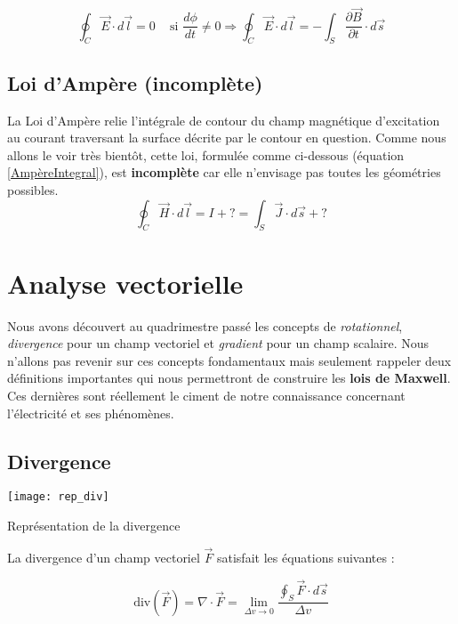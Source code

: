 \begin{equation}
 \oint_{C} \vec{E} \cdot d\vec{l} = 0 \hspace{10pt} \mbox{ si } \frac{d\phi}{dt} \not = 0 \Rightarrow  \oint_{C} \vec{E} \cdot d\vec{l} = -\int_{S} \frac{\partial \vec{B}}{\partial t} \cdot d\vec{s}
 \label{PotentielIntegral}
\end{equation}

\subsection{Loi d'Ampère (incomplète)}

La Loi d'Ampère relie l'intégrale de contour du champ magnétique d'excitation au courant traversant la surface décrite par le contour en question. 
Comme nous allons le voir très bientôt, cette loi, formulée comme ci-dessous (équation \ref{AmpèreIntegral}), est \textbf{incomplète} car elle n'envisage pas toutes les géométries possibles.
\begin{equation}
 \oint_{C} \vec{H} \cdot d\vec{l} = I + ? = \int_{S} \vec{J} \cdot d\vec{s} + ? 
 \label{AmpèreIntegral}
\end{equation}

\section{Analyse vectorielle}

Nous avons découvert au quadrimestre passé les concepts de \textit{rotationnel}, \textit{divergence} pour un champ vectoriel et \textit{gradient} pour un champ scalaire.
Nous n'allons pas revenir sur ces concepts fondamentaux mais seulement rappeler deux définitions importantes qui nous permettront de construire les \textbf{lois de Maxwell}. 
Ces dernières sont réellement le ciment de notre connaissance concernant l'électricité et ses phénomènes.

\subsection{Divergence} 
\begin{marginfigure}[0cm]
	\texttt{[image: rep\_div]}
	\caption{Représentation de la divergence}
\end{marginfigure}

La divergence d'un champ vectoriel $\vec{F}$ satisfait les équations suivantes : 

\[ \text{div}(\vec{F}) = \nabla \cdot \vec{F} = \lim_{\Delta v \to 0} \frac{\oint_{S} \vec{F} \cdot d\vec{s}}{\Delta v} \]

